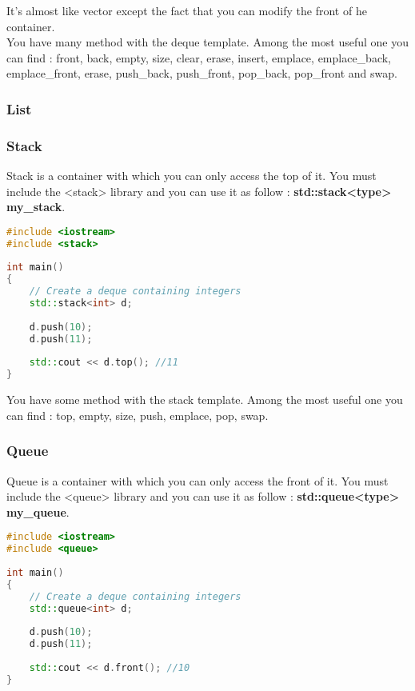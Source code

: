 \documentclass[a4paper, 12pt, titlepage]{scrartcl} %
\begin{document}
It's almost like vector except the fact that you can modify the front of he container. \\
You have many method with the deque template. Among the most useful one you can find : front, back, empty, size, clear, erase, insert, emplace, emplace\_back, emplace\_front,  erase, push\_back, push\_front, pop\_back, pop\_front and swap.

\subsubsection{List}
\subsubsection{Stack}
Stack is a container with which you can only access the top of it. You must include the <stack> library and you can use it as follow : \textbf{std::stack<type> my\_stack}.

\begin{lstlisting}[language=C++]
#include <iostream>
#include <stack>
 
int main()
{
    // Create a deque containing integers
    std::stack<int> d;
 
    d.push(10);
    d.push(11);
    
    std::cout << d.top(); //11
}
\end{lstlisting} \vspace{5mm}

You have some method with the stack template. Among the most useful one you can find : top, empty, size, push, emplace, pop, swap.

\subsubsection{Queue}
Queue is a container with which you can only access the front of it. You must include the <queue> library and you can use it as follow : \textbf{std::queue<type> my\_queue}.

\begin{lstlisting}[language=C++]
#include <iostream>
#include <queue>
 
int main()
{
    // Create a deque containing integers
    std::queue<int> d;
 
    d.push(10);
    d.push(11);
    
    std::cout << d.front(); //10
}
\end{lstlisting} \vspace{5mm}
\end{document}
